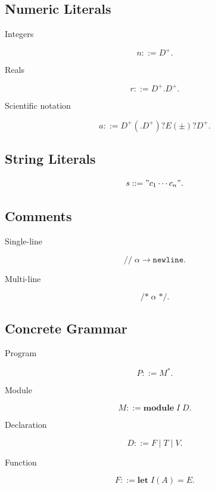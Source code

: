 \documentclass[12pt,oneside]{article}
\theoremstyle{definition}
\theoremstyle{remark}
\begin{document}
\subsection*{Numeric Literals}

Integers

\[
n
::=
D^+.
\]

Reals

\[
r
::=
D^+
.
D^+.
\]

Scientific notation

\[
a
::=
D^+
(
.
D^+
)?
E
(\pm)?
D^+.
\]

\subsection*{String Literals}

\[
s
::=
"
c_1
\cdots
c_n
".
\]

\subsection*{Comments}

Single-line

\[
\texttt{//}\;
\alpha
\rightarrow
\texttt{newline}.
\]

Multi-line

\[
\texttt{/*}
\;
\alpha
\;
\texttt{*/}.
\]

\subsection*{Concrete Grammar}

Program

\[
P
::=
M^*.
\]

Module

\[
M
::=
\mathbf{module}
\;
I
\;
D.
\]

Declaration

\[
D
::=
F
\mid
T
\mid
V.
\]

Function

\[
F
::=
\mathbf{let}
\;
I
(
A
)
=
E.
\]
\end{document}
